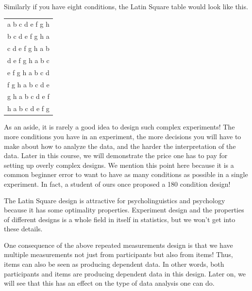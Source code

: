 \documentclass[12pt,]{krantz}
\begin{document}
Similarly if you have eight conditions, the Latin Square table would look like this.

\begin{longtable}[]{@{}l@{}}
\toprule
\endhead
\textbar{} a \textbar{} b \textbar{} c \textbar{} d \textbar{} e \textbar{} f \textbar{} g \textbar{} h \textbar{}\tabularnewline
\textbar{} b \textbar{} c \textbar{} d \textbar{} e \textbar{} f \textbar{} g \textbar{} h \textbar{} a \textbar{}\tabularnewline
\textbar{} c \textbar{} d \textbar{} e \textbar{} f \textbar{} g \textbar{} h \textbar{} a \textbar{} b \textbar{}\tabularnewline
\textbar{} d \textbar{} e \textbar{} f \textbar{} g \textbar{} h \textbar{} a \textbar{} b \textbar{} c \textbar{}\tabularnewline
\textbar{} e \textbar{} f \textbar{} g \textbar{} h \textbar{} a \textbar{} b \textbar{} c \textbar{} d \textbar{}\tabularnewline
\textbar{} f \textbar{} g \textbar{} h \textbar{} a \textbar{} b \textbar{} c \textbar{} d \textbar{} e \textbar{}\tabularnewline
\textbar{} g \textbar{} h \textbar{} a \textbar{} b \textbar{} c \textbar{} d \textbar{} e \textbar{} f \textbar{}\tabularnewline
\textbar{} h \textbar{} a \textbar{} b \textbar{} c \textbar{} d \textbar{} e \textbar{} f \textbar{} g \textbar{}\tabularnewline
\bottomrule
\end{longtable}

As an aside, it is rarely a good idea to design such complex experiments! The more conditions you have in an experiment, the more decisions you will have to make about how to analyze the data, and the harder the interpretation of the data. Later in this course, we will demonstrate the price one has to pay for setting up overly complex designs. We mention this point here because it is a common beginner error to want to have as many conditions as possible in a single experiment. In fact, a student of ours once proposed a 180 condition design!

The Latin Square design is attractive for psycholinguistics and psychology because it has some optimality properties. Experiment design and the properties of different designs is a whole field in itself in statistics, but we won't get into these details.

One consequence of the above repeated measurements design is that we have multiple measurements not just from participants but also from items! Thus, items can also be seen as producing dependent data. In other words, both participants and items are producing dependent data in this design. Later on, we will see that this has an effect on the type of data analysis one can do.
\end{document}
